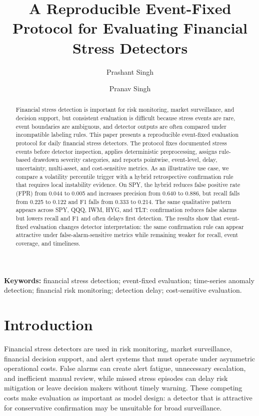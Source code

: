 \documentclass[10pt,twocolumn]{article}
\title{A Reproducible Event-Fixed Protocol for Evaluating Financial Stress Detectors}
\author{Prashant Singh \and Pranav Singh}
\date{}
\begin{document}
\maketitle

\begin{abstract}
Financial stress detection is important for risk monitoring, market surveillance, and decision support, but consistent evaluation is difficult because stress events are rare, event boundaries are ambiguous, and detector outputs are often compared under incompatible labeling rules. This paper presents a reproducible event-fixed evaluation protocol for daily financial stress detectors. The protocol fixes documented stress events before detector inspection, applies deterministic preprocessing, assigns rule-based drawdown severity categories, and reports pointwise, event-level, delay, uncertainty, multi-asset, and cost-sensitive metrics. As an illustrative use case, we compare a volatility percentile trigger with a hybrid retrospective confirmation rule that requires local instability evidence. On SPY, the hybrid reduces false positive rate (FPR) from 0.044 to 0.005 and increases precision from 0.640 to 0.886, but recall falls from 0.225 to 0.122 and F1 falls from 0.333 to 0.214. The same qualitative pattern appears across SPY, QQQ, IWM, HYG, and TLT: confirmation reduces false alarms but lowers recall and F1 and often delays first detection. The results show that event-fixed evaluation changes detector interpretation: the same confirmation rule can appear attractive under false-alarm-sensitive metrics while remaining weaker for recall, event coverage, and timeliness.
\end{abstract}

\noindent\textbf{Keywords:} financial stress detection; event-fixed evaluation; time-series anomaly detection; financial risk monitoring; detection delay; cost-sensitive evaluation.

\section{Introduction}
Financial stress detectors are used in risk monitoring, market surveillance, financial decision support, and alert systems that must operate under asymmetric operational costs. False alarms can create alert fatigue, unnecessary escalation, and inefficient manual review, while missed stress episodes can delay risk mitigation or leave decision makers without timely warning. These competing costs make evaluation as important as model design: a detector that is attractive for conservative confirmation may be unsuitable for broad surveillance.
\end{document}
